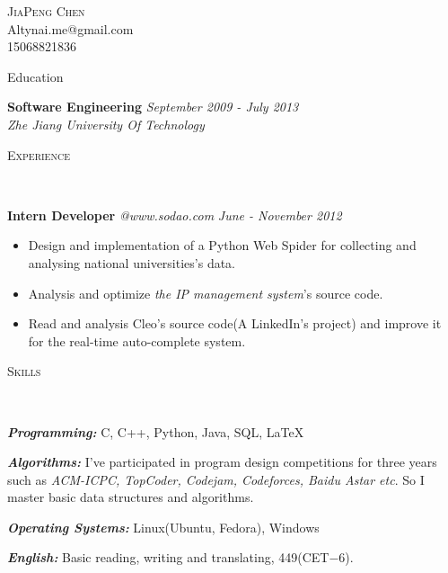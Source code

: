 ﻿\documentclass[9pt]{article}
\newenvironment{changemargin}[2]{%
  \begin{list}{}{%
    \setlength{\topsep}{0pt}%
    \setlength{\leftmargin}{#1}%
    \setlength{\rightmargin}{#2}%
    \setlength{\listparindent}{\parindent}%
    \setlength{\itemindent}{\parindent}%
    \setlength{\parsep}{\parskip}%
  }%
  \item[]}{\end{list}
}
\newcommand{\lineover}{
	\begin{changemargin}{-0.05in}{-0.05in}
		\vspace*{-8pt}
		\hrulefill \\
		\vspace*{-2pt}
	\end{changemargin}
}
\newcommand{\header}[1]{
	\begin{changemargin}{-0.5in}{-0.5in}
		\scshape{#1}\\
  	\lineover
	\end{changemargin}
}
\newcommand{\contact}[4]{
	\begin{changemargin}{-0.5in}{-0.5in}
		\begin{center}
			{\Large \scshape {#1}}\\ \smallskip
			{#2}\\ \smallskip
			{#3}\\ \smallskip
			{#4}\smallskip
		\end{center}
	\end{changemargin}
}
\newenvironment{body} {
	\vspace*{-16pt}
	\begin{changemargin}{-0.25in}{-0.5in}
  }	
	{\end{changemargin}
}
\begin{document}
\contact{JiaPeng Chen}{Altynai.me@gmail.com}{15068821836}

\header{Education}
\begin{body}
	\vspace{14pt}
	\textbf{Software Engineering} \hfill \emph{September 2009 - July 2013} \\
	\emph{Zhe Jiang University Of Technology}\\
\end{body}

\smallskip

\header{Experience}

\begin{body}
	\vspace{14pt}

	\textbf{Intern Developer} \emph{@www.sodao.com} \hfill \emph{June - November 2012}\\
	\vspace*{-4pt}
	\begin{itemize} \itemsep -0pt  %
		\item Design and implementation of a Python Web Spider for collecting and analysing national universities's data.
        \item Analysis and optimize \emph{the IP management system}'s source code.
        \item Read and analysis Cleo's source code(A LinkedIn's project) and improve it for the real-time auto-complete system.
	\end{itemize}

\end{body}

\smallskip


\header{Skills}

\begin{body}
	\vspace{14pt}
	\emph{\textbf{Programming:}}{} C, C++, Python, Java, SQL, \LaTeX \\
	\medskip

    \emph{\textbf{Algorithms:}}{} I've participated in program design competitions for three years such as \emph{ACM-ICPC,
TopCoder, Codejam, Codeforces, Baidu Astar etc}. So I master basic data structures and algorithms.\\
	\medskip

	\emph{\textbf{Operating Systems:}}{} Linux(Ubuntu, Fedora), Windows \\
    \medskip

    \emph{\textbf{English:}}{} Basic reading, writing and translating, 449(CET$-$6).\\
\end{body}
\end{document}
